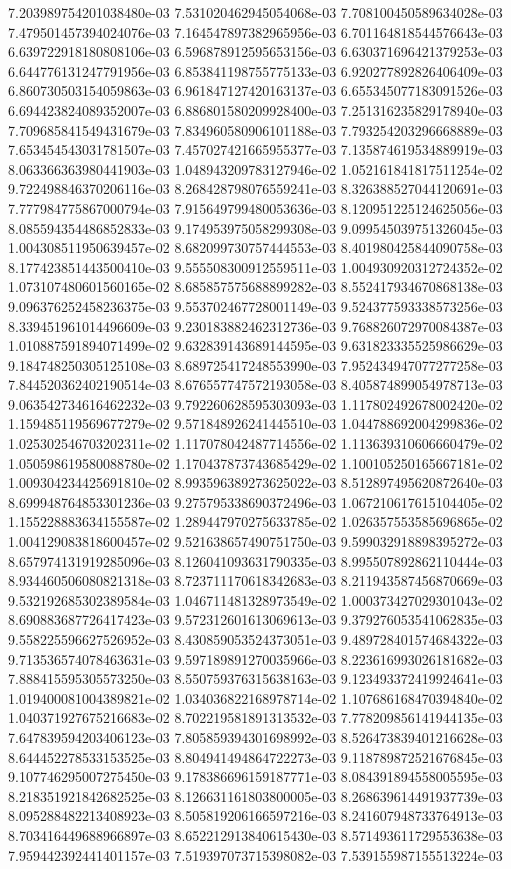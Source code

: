 7.203989754201038480e-03
7.531020462945054068e-03
7.708100450589634028e-03
7.479501457394024076e-03
7.164547897382965956e-03
6.701164818544576643e-03
6.639722918180808106e-03
6.596878912595653156e-03
6.630371696421379253e-03
6.644776131247791956e-03
6.853841198755775133e-03
6.920277892826406409e-03
6.860730503154059863e-03
6.961847127420163137e-03
6.655345077183091526e-03
6.694423824089352007e-03
6.886801580209928400e-03
7.251316235829178940e-03
7.709685841549431679e-03
7.834960580906101188e-03
7.793254203296668889e-03
7.653454543031781507e-03
7.457027421665955377e-03
7.135874619534889919e-03
8.063366363980441903e-03
1.048943209783127946e-02
1.052161841817511254e-02
9.722498846370206116e-03
8.268428798076559241e-03
8.326388527044120691e-03
7.777984775867000794e-03
7.915649799480053636e-03
8.120951225124625056e-03
8.085594354486852833e-03
9.174953975058299308e-03
9.099545039751326045e-03
1.004308511950639457e-02
8.682099730757444553e-03
8.401980425844090758e-03
8.177423851443500410e-03
9.555508300912559511e-03
1.004930920312724352e-02
1.073107480601560165e-02
8.685857575688899282e-03
8.552417934670868138e-03
9.096376252458236375e-03
9.553702467728001149e-03
9.524377593338573256e-03
8.339451961014496609e-03
9.230183882462312736e-03
9.768826072970084387e-03
1.010887591894071499e-02
9.632839143689144595e-03
9.631823335525986629e-03
9.184748250305125108e-03
8.689725417248553990e-03
7.952434947077277258e-03
7.844520362402190514e-03
8.676557747572193058e-03
8.405874899054978713e-03
9.063542734616462232e-03
9.792260628595303093e-03
1.117802492678002420e-02
1.159485119569677279e-02
9.571848926241445510e-03
1.044788692004299836e-02
1.025302546703202311e-02
1.117078042487714556e-02
1.113639310606660479e-02
1.050598619580088780e-02
1.170437873743685429e-02
1.100105250165667181e-02
1.009304234425691810e-02
8.993596389273625022e-03
8.512897495620872640e-03
8.699948764853301236e-03
9.275795338690372496e-03
1.067210617615104405e-02
1.155228883634155587e-02
1.289447970275633785e-02
1.026357553585696865e-02
1.004129083818600457e-02
9.521638657490751750e-03
9.599032918898395272e-03
8.657974131919285096e-03
8.126041093631790335e-03
8.995507892862110444e-03
8.934460506080821318e-03
8.723711170618342683e-03
8.211943587456870669e-03
9.532192685302389584e-03
1.046711481328973549e-02
1.000373427029301043e-02
8.690883687726417423e-03
9.572312601613069613e-03
9.379276053541062835e-03
9.558225596627526952e-03
8.430859053524373051e-03
9.489728401574684322e-03
9.713536574078463631e-03
9.597189891270035966e-03
8.223616993026181682e-03
7.888415595305573250e-03
8.550759376315638163e-03
9.123493372419924641e-03
1.019400081004389821e-02
1.034036822168978714e-02
1.107686168470394840e-02
1.040371927675216683e-02
8.702219581891313532e-03
7.778209856141944135e-03
7.647839594203406123e-03
7.805859394301698992e-03
8.526473839401216628e-03
8.644452278533153525e-03
8.804941494864722273e-03
9.118789872521676845e-03
9.107746295007275450e-03
9.178386696159187771e-03
8.084391894558005595e-03
8.218351921842682525e-03
8.126631161803800005e-03
8.268639614491937739e-03
8.095288482213408923e-03
8.505819206166597216e-03
8.241607948733764913e-03
8.703416449688966897e-03
8.652212913840615430e-03
8.571493611729553638e-03
7.959442392441401157e-03
7.519397073715398082e-03
7.539155987155513224e-03
